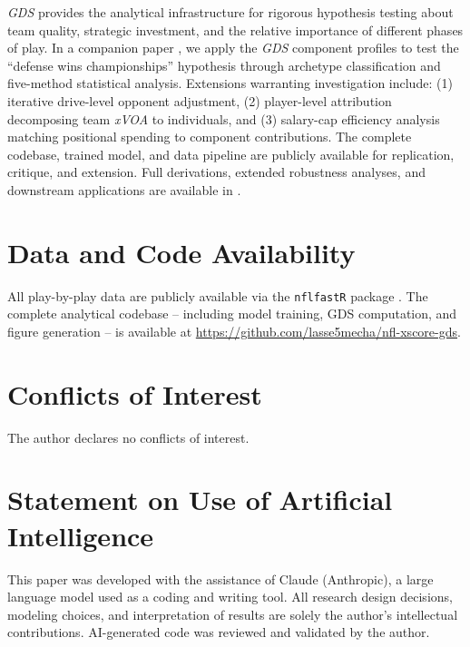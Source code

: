 \documentclass[12pt,a4paper]{article}
\newcommand{\xvoa}{\textit{xVOA}}
\newcommand{\gds}{\textit{GDS}}
\begin{document}
\gds{} provides the analytical infrastructure for rigorous hypothesis testing about team quality, strategic investment, and the relative importance of different phases of play. In a companion paper \citep{mecha2026archetypes}, we apply the \gds{} component profiles to test the ``defense wins championships'' hypothesis through archetype classification and five-method statistical analysis. Extensions warranting investigation include: (1) iterative drive-level opponent adjustment, (2) player-level attribution decomposing team \xvoa{} to individuals, and (3) salary-cap efficiency analysis matching positional spending to component contributions. The complete codebase, trained model, and data pipeline are publicly available for replication, critique, and extension. Full derivations, extended robustness analyses, and downstream applications are available in \citet{mecha2026xscore}.

\section*{Data and Code Availability}

All play-by-play data are publicly available via the \texttt{nflfastR} package \citep{carl2021nflfastr}. The complete analytical codebase -- including model training, GDS computation, and figure generation -- is available at \url{https://github.com/lasse5mecha/nfl-xscore-gds}.

\section*{Conflicts of Interest}

The author declares no conflicts of interest.

\section*{Statement on Use of Artificial Intelligence}

This paper was developed with the assistance of Claude (Anthropic), a large language model used as a coding and writing tool. All research design decisions, modeling choices, and interpretation of results are solely the author's intellectual contributions. AI-generated code was reviewed and validated by the author.

\printbibliography
\end{document}
